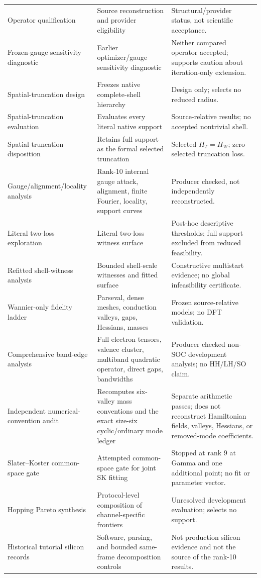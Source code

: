 \documentclass[11pt]{article}
\theoremstyle{definition}
\begin{document}
\begin{longtable}{@{}p{}p{}p{}@{}}
Operator qualification
& Source reconstruction and provider eligibility
& Structural/provider status, not scientific acceptance.\\
Frozen-gauge sensitivity diagnostic
& Earlier optimizer/gauge sensitivity diagnostic
& Neither compared operator accepted; supports caution about iteration-only extension.\\
Spatial-truncation design
& Freezes native complete-shell hierarchy
& Design only; selects no reduced radius.\\
Spatial-truncation evaluation
& Evaluates every literal native support
& Source-relative results; no accepted nontrivial shell.\\
Spatial-truncation disposition
& Retains full support as the formal selected truncation
& Selected $H_T=H_W$; zero selected truncation loss.\\
Gauge/alignment/locality analysis
& Rank-10 internal gauge attack, alignment, finite Fourier, locality, support curves
& Producer checked, not independently reconstructed.\\
Literal two-loss exploration
& Literal two-loss witness surface
& Post-hoc descriptive thresholds; full support excluded from reduced feasibility.\\
Refitted shell-witness analysis
& Bounded shell-scale witnesses and fitted surface
& Constructive multistart evidence; no global infeasibility certificate.\\
Wannier-only fidelity ladder
& Parseval, dense meshes, conduction valleys, gaps, Hessians, masses
& Frozen source-relative models; no DFT validation.\\
Comprehensive band-edge analysis
& Full electron tensors, valence cluster, multiband quadratic operator, direct gaps, bandwidths
& Producer checked non-SOC development analysis; no HH/LH/SO claim.\\
Independent numerical-convention audit
& Recomputes six-valley mass conventions and the exact size-six cyclic/ordinary mode ledger
& Separate arithmetic passes; does not reconstruct Hamiltonian fields, valleys, Hessians, or removed-mode coefficients.\\
Slater--Koster common-space gate
& Attempted common-space gate for joint SK fitting
& Stopped at rank 9 at Gamma and one additional point; no fit or parameter vector.\\
Hopping Pareto synthesis
& Protocol-level composition of channel-specific frontiers
& Unresolved development evaluation; selects no support.\\
Historical tutorial silicon records
& Software, parsing, and bounded same-frame decomposition controls
& Not production silicon evidence and not the source of the rank-10 results.\\
\bottomrule
\end{longtable}
\normalsize
\end{document}
